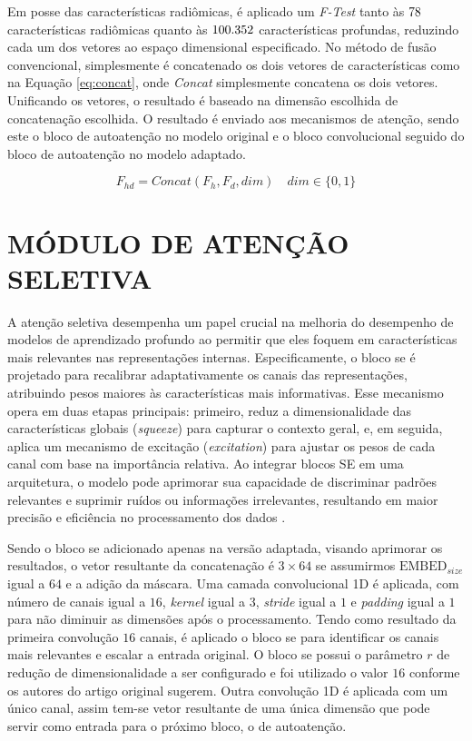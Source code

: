 Em posse das características radiômicas, é aplicado um \textit{F-Test} tanto às $78$ características radiômicas quanto às $100.352$ características profundas, reduzindo cada um dos vetores ao espaço dimensional especificado. No método de fusão convencional, simplesmente é concatenado os dois vetores de características como na Equação \ref{eq:concat}, onde \textit{Concat} simplesmente concatena os dois vetores. Unificando os vetores, o resultado é baseado na dimensão escolhida de concatenação escolhida. O resultado é enviado aos mecanismos de atenção, sendo este o bloco de autoatenção no modelo original e o bloco convolucional seguido do bloco de autoatenção no modelo adaptado.

\begin{equation}
F_{hd} = \textit{Concat}(F_h, F_d, dim) \quad dim \in \{0,1\}
\label{eq:concat}
\end{equation}

\section{MÓDULO DE ATENÇÃO SELETIVA}
\label{subsec:cap4_mod_selective_attn}

A atenção seletiva desempenha um papel crucial na melhoria do desempenho de modelos de aprendizado profundo ao permitir que eles foquem em características mais relevantes nas representações internas. Especificamente, o bloco \gls{se} é projetado para recalibrar adaptativamente os canais das representações, atribuindo pesos maiores às características mais informativas. Esse mecanismo opera em duas etapas principais: primeiro, reduz a dimensionalidade das características globais (\textit{squeeze}) para capturar o contexto geral, e, em seguida, aplica um mecanismo de excitação (\textit{excitation}) para ajustar os pesos de cada canal com base na importância relativa. Ao integrar blocos SE em uma arquitetura, o modelo pode aprimorar sua capacidade de discriminar padrões relevantes e suprimir ruídos ou informações irrelevantes, resultando em maior precisão e eficiência no processamento dos dados \cite{huSqueezeandExcitationNetworks2018}.

Sendo o bloco \gls{se} adicionado apenas na versão adaptada, visando aprimorar os resultados, o vetor resultante da concatenação é $3\times64$ se assumirmos $\text{EMBED}_{size}$ igual a $64$ e a adição da máscara. Uma camada convolucional 1D é aplicada, com número de canais igual a $16$, \textit{kernel} igual a 3, \textit{stride} igual a $1$ e \textit{padding} igual a $1$ para não diminuir as dimensões após o processamento. Tendo como resultado da primeira convolução $16$ canais, é aplicado o bloco \gls{se} para identificar os canais mais relevantes e escalar a entrada original. O bloco \gls{se} possui o parâmetro $r$ de redução de dimensionalidade a ser configurado e foi utilizado o valor $16$ conforme os autores do artigo original sugerem. Outra convolução 1D é aplicada com um único canal, assim tem-se vetor resultante de uma única dimensão que pode servir como entrada para o próximo bloco, o de autoatenção.

